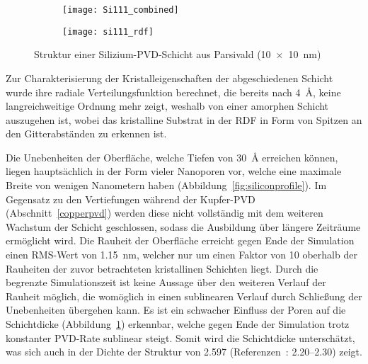 \begin{figure}[thp]
  \captionsetup[subfigure]{singlelinecheck=false}
  \def\subfigwidth{0.48\textwidth}
  \begin{subfigure}[t]{\subfigwidth}
    \texttt{[image: Si111\_combined]}
    \label{fig:siliconresults-a}
  \end{subfigure}
  \hfill
  \begin{subfigure}[t]{\subfigwidth}
    \texttt{[image: si111\_rdf]}
    \label{fig:siliconresults-b}
  \end{subfigure}
  \caption[Struktur einer Silizium-PVD-Schicht aus Parsivald]{
    Struktur einer Silizium-PVD-Schicht aus Parsivald (\SI{10x10}{\nano\meter})
  }
  \label{fig:siliconresults}
\end{figure}

Zur Charakterisierung der Kristalleigenschaften der abgeschiedenen Schicht wurde ihre radiale Verteilungsfunktion berechnet, die bereits nach \SI{4}{\angstrom}, keine langreichweitige Ordnung mehr zeigt, weshalb von einer amorphen Schicht auszugehen ist, wobei das kristalline Substrat in der RDF in Form von Spitzen an den Gitterabständen zu erkennen ist.

Die Unebenheiten der Oberfläche, welche Tiefen von \SI{30}{\angstrom} erreichen können, liegen hauptsächlich in der Form vieler Nanoporen vor, welche eine maximale Breite von wenigen Nanometern haben (Abbildung~\ref{fig:siliconprofile}).
Im Gegensatz zu den Vertiefungen während der Kupfer-PVD (Abschnitt~\ref{copperpvd}) werden diese nicht vollständig mit dem weiteren Wachstum der Schicht geschlossen, sodass die Ausbildung über längere Zeiträume ermöglicht wird.
Die Rauheit der Oberfläche erreicht gegen Ende der Simulation einen RMS-Wert von \SI{1.15}{\nano\meter}, welcher nur um einen Faktor von \num{10} oberhalb der Rauheiten der zuvor betrachteten kristallinen Schichten liegt.
Durch die begrenzte Simulationszeit ist keine Aussage über den weiteren Verlauf der Rauheit möglich, die womöglich in einen sublinearen Verlauf durch Schließung der Unebenheiten übergehen kann.
Es ist ein schwacher Einfluss der Poren auf die Schichtdicke (Abbildung~\ref{fig:siliconresults-a}) erkennbar, welche gegen Ende der Simulation trotz konstanter PVD-Rate sublinear steigt.
Somit wird die Schichtdicke unterschätzt, was sich auch in der Dichte der Struktur von \SI{2.597}{\gpcc} (Referenzen~\cite{remes_optical_1998,renner_density_1973}: \SIrange{2.20}{2.30}{\gpcc}) zeigt.

